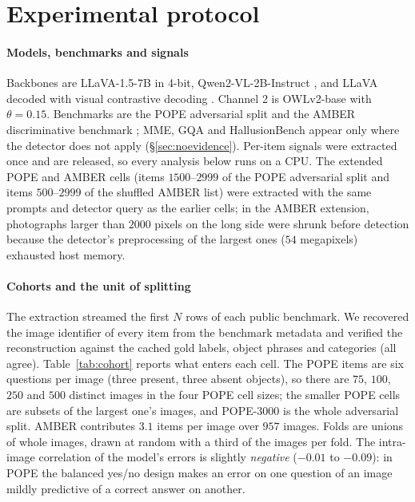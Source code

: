 \section{Experimental protocol}
\label{sec:protocol}

\paragraph{Models, benchmarks and signals}
Backbones are LLaVA-1.5-7B \citep{llava} in 4-bit, Qwen2-VL-2B-Instruct \citep{qwenvl}, and LLaVA decoded with
visual contrastive decoding \citep{vcd}. Channel 2 is OWLv2-base \citep{owlv2} with $\theta=0.15$. Benchmarks are
the POPE adversarial split \citep{pope} and the AMBER discriminative benchmark \citep{amber}; MME, GQA and
HallusionBench appear only where the detector does not apply (\S\ref{sec:noevidence}). Per-item signals were
extracted once and are released, so every analysis below runs on a CPU. The extended POPE and AMBER cells (items $1500$--$2999$ of the
POPE adversarial split and items $500$--$2999$ of the shuffled AMBER list) were extracted with the same prompts and detector query as the
earlier cells; in the AMBER extension, photographs larger than $2000$ pixels on the long side were shrunk before detection because the
detector's preprocessing of the largest ones ($54$ megapixels) exhausted host memory.

\paragraph{Cohorts and the unit of splitting}
The extraction streamed the first $N$ rows of each public benchmark. We recovered the image identifier of every
item from the benchmark metadata and verified the reconstruction against the cached gold labels, object phrases
and categories (all agree). Table~\ref{tab:cohort} reports what enters each cell. The POPE items are
six questions per image (three present, three absent objects), so there are $75$, $100$, $250$ and $500$ distinct
images in the four POPE cell sizes; the smaller POPE cells are subsets of the largest one's images, and POPE-3000 is the whole
adversarial split. AMBER contributes $3.1$ items per image over $957$ images. Folds are unions of whole images, drawn at
random with a third of the images per fold. The intra-image correlation of the model's errors is slightly \emph{negative}
($-0.01$ to $-0.09$): in POPE the balanced yes/no design makes an error on one question of an image mildly predictive of a
correct answer on another.

